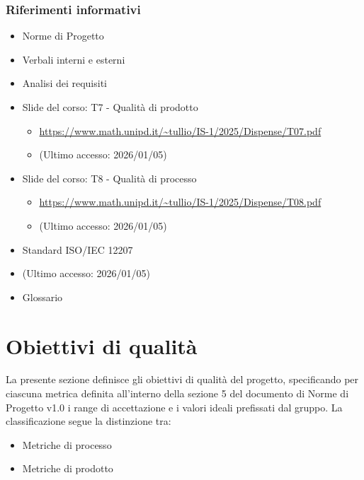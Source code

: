 \documentclass[a4paper,12pt]{article}
\begin{document}
{            \subsubsection{Riferimenti informativi}
                \begin{itemize}
                    \item Norme di Progetto
                    \item Verbali interni e esterni
                    \item Analisi dei requisiti
                    \item Slide del corso: T7 - Qualità di prodotto
                    \begin{itemize}
                        \item \url{https://www.math.unipd.it/~tullio/IS-1/2025/Dispense/T07.pdf}
                         \item[] (Ultimo accesso: 2026/01/05)
                    \end{itemize}
                    \item Slide del corso: T8 - Qualità di processo
                    \begin{itemize}
                        \item \url{https://www.math.unipd.it/~tullio/IS-1/2025/Dispense/T08.pdf}
                        \item[] (Ultimo accesso: 2026/01/05)
                    \end{itemize}
                    \item Standard ISO/IEC 12207
                        \item[] (Ultimo accesso: 2026/01/05)
                    \item Glossario
                \end{itemize}
    }

    \newpage

    \section{Obiettivi di qualità}
    La presente sezione definisce gli obiettivi di qualità del progetto, specificando per ciascuna metrica definita all'interno della sezione 5 del documento di Norme di Progetto v1.0 i range di accettazione e i valori ideali prefissati dal gruppo. La classificazione segue la distinzione tra:
    \begin{itemize}
        \item Metriche di processo
        \item Metriche di prodotto
    \end{itemize}
    
\end{document}
